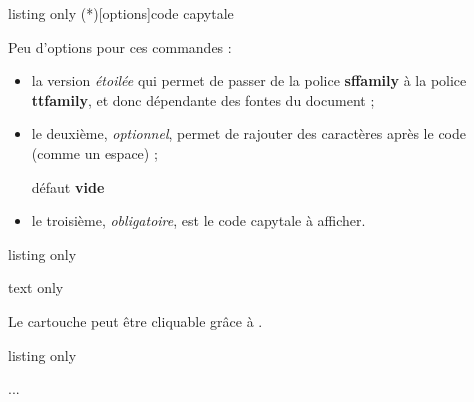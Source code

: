 \documentclass[a4paper,french,11pt]{article}
\newcommand\ctex[1]{\tcbox[vignettelatex]{#1}}
\newcommand\Cle[1]{{\bfseries\sffamily\textlangle \textcolor{orange!75!black}{#1}\textrangle}}
\begin{document}
\begin{PresCodeTexPL}{listing only}
\CartoucheCapytale(*)[options]{code capytale}
\end{PresCodeTexPL}

\begin{cautionblock}
Peu d'options pour ces commandes :

\begin{itemize}
	\item la version \textit{étoilée} qui permet de  passer de la police \Cle{sffamily} à la police \Cle{ttfamily}, et donc dépendante des fontes du document ;
	\item le deuxième, \textit{optionnel}, permet de rajouter des caractères après le code (comme un \textsf{espace}) ;
	
	\hfill{}défaut \Cle{vide}
	\item le troisième, \textit{obligatoire}, est le \textsf{code capytale} à afficher.
\end{itemize}
\vspace*{-\baselineskip}\leavevmode
\end{cautionblock}

\begin{PresCodeTexPL}{listing only}



\end{PresCodeTexPL}

\begin{PresCodeSortiePL}{text only}



\end{PresCodeSortiePL}

\begin{noteblock}
Le \textsf{cartouche} peut être \og cliquable \fg{} grâce à \ctex{href}.
\end{noteblock}

\begin{PresCodeTexPL}{listing only}
\usepackage{hyperref}
...
\href{https://capytale2.ac-paris.fr/web/c/abcd-12345}{}
\end{PresCodeTexPL}
\end{document}
